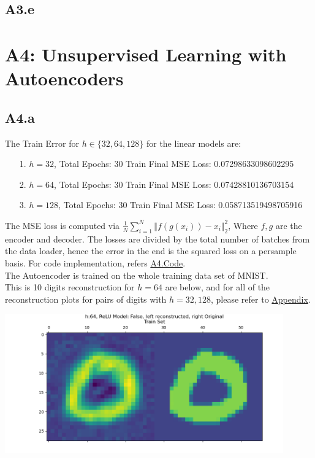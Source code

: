 \documentclass[]{article}
\begin{document}
    \subsection*{A3.e}

\section*{A4: Unsupervised Learning with Autoencoders}
    \subsection*{A4.a}
        The Train Error for $h\in\{32, 64, 128\}$ for the linear models are: 
        \begin{enumerate}
            \item[1.] $h = 32$, Total Epochs: 30 Train Final MSE Loss: 0.07298633098602295
            \item[2.] $h = 64$, Total Epochs: 30 Train Final MSE Loss: 0.07428810136703154
            \item[3.] $h = 128$, Total Epochs: 30 Train Final MSE Loss: 0.058713519498705916 
        \end{enumerate}
        The MSE loss is computed via $\frac{1}{N}\sum_{i=1}^{N} \Vert f(g(x_i)) - x_i \Vert_2^2$, Where $f, g$ are the encoder and decoder. The losses are divided by the total number of batches from the data loader, hence the error in the end is the squared loss on a persample basis. For code implementation, refers \hyperref[A4.Code]{A4.Code}. 
        \\
        The Autoencoder is trained on the whole training data set of MNIST. 
        \\[1.1em]
        This is 10 digits reconstruction for $h = 64$ are below, and for all of the reconstruction plots for pairs of digits with $h=32, 128$, please refer to \hyperref[extra-a4-lin]{Appendix}.
        \begin{center}
            \includegraphics*[width=12cm]{A4plots/06-43-17-h-64-lin-digit-0.png}
        \end{center}
\end{document}
